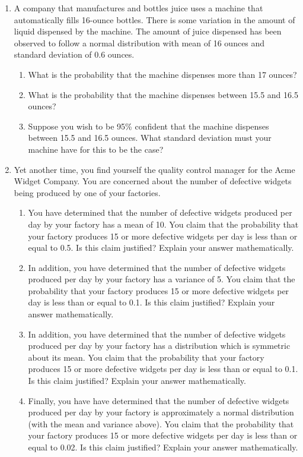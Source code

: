\documentclass[12pt]{article}
\begin{document}
\begin{enumerate}
\item A company that manufactures and bottles juice uses a machine that automatically fills 16-ounce bottles. There is some variation in the amount of liquid dispensed by the machine. The amount of juice dispensed has been observed to follow a normal distribution with mean of 16 ounces and standard deviation of 0.6 ounces.
\begin{enumerate}
\item What is the probability that the machine dispenses more than 17 ounces?
\item What is the probability that the machine dispenses between 15.5 and 16.5 ounces?
\item Suppose you wish to be 95\% confident that the machine dispenses between 15.5 and 16.5 ounces. What standard deviation must your machine have for this to be the case?
\end{enumerate}

\item Yet another time, you find yourself the quality control manager for the Acme Widget Company. You are concerned about the number of defective widgets being produced by one of your factories.
\begin{enumerate}
\item You have determined that the number of defective widgets produced per day by your factory has a mean of 10. You claim that the probability that your factory produces 15 or more defective widgets per day is less than or equal to 0.5. Is this claim justified? Explain your answer mathematically.

\item In addition, you have determined that the number of defective widgets produced per day by your factory has a variance of 5. You claim that the probability that your factory produces 15 or more defective widgets per day is less than or equal to 0.1. Is this claim justified? Explain your answer mathematically.

\item In addition, you have determined that the number of defective widgets produced per day by your factory has a distribution which is symmetric about its mean. You claim that the probability that your factory produces 15 or more defective widgets per day is less than or equal to 0.1. Is this claim justified? Explain your answer mathematically.

\item Finally, you have have determined that the number of defective widgets produced per day by your factory is approximately a normal distribution (with the mean and variance above). You claim that the probability that your factory produces 15 or more defective widgets per day is less than or equal to 0.02. Is this claim justified? Explain your answer mathematically.


\end{enumerate}
\end{enumerate}
\end{document}
